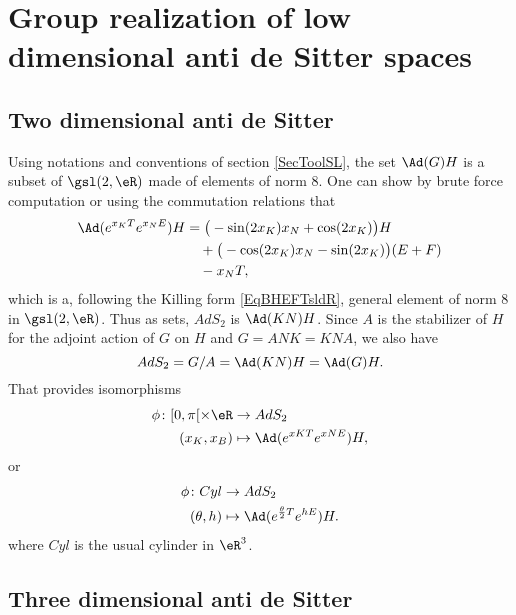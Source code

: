 \section[Low dimensional anti de Sitter spaces]{Group realization of low dimensional anti de Sitter spaces}

\subsection{Two dimensional anti de Sitter}		\label{SubsecTwoDimAdSAdGH}

Using notations and conventions of section \ref{SecToolSL}, the set $\Ad(G)H$ is a subset of $\gsl(2,\eR)$ made of elements of norm $8$. One can show by brute force computation or using the commutation relations that 
\[ 
\begin{split}
 \Ad( e^{x_KT} e^{x_NE})H&=\big( -\sin(2x_K)x_N+\cos(2x_K) \big)H\\
			&\quad+\big( -\cos(2x_K)x_N-\sin(2x_K) \big)(E+F)\\
			&\quad-x_NT,
\end{split}  
\]
which is a, following the Killing form \eqref{EqBHEFTsldR},  general element of norm $8$ in $\gsl(2,\eR)$. Thus as sets, $AdS_2$ is $\Ad(KN)H$.  Since $A$ is the stabilizer of $H$ for the adjoint action of $G$ on $H$ and $G=ANK=KNA$, we also have
\[ 
  AdS_2=G/A=\Ad(KN)H=\Ad(G)H.
\]
That provides isomorphisms
\begin{equation}
\begin{aligned}
 \phi\colon [0,\pi[\times\eR&\to AdS_2 \\ 
(x_K,x_B)&\mapsto \Ad( e^{xK T} e^{xNE})H,
\end{aligned}
 \end{equation}
or
\begin{equation}	 \label{EqCylAdSDeux}
\begin{aligned}
 \phi\colon Cyl&\to AdS_2 \\ 
(\theta,h)&\mapsto \Ad( e^{\frac{ \theta }{ 2 }T} e^{hE})H. 
\end{aligned}
\end{equation}
where $Cyl$ is the usual cylinder in $\eR^3$.

\subsection{Three dimensional anti de Sitter}		\label{SubsecGpAdsDeux}

